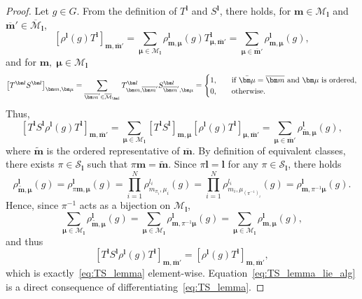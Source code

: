 \documentclass{article}
\newcommand{\rep}[2]{\rho^{#1}_{#2}}
\numberwithin{equation}{section}
\def\bl{{\bm l}}
\def\bbm{{\bm m}}
\def\bmu{{\bm \mu}}
\def\obm{{\overline\bbm}}
\def\calM{\mathcal{M}}
\def\calS{\mathcal{S}}
\def\oMl{\overline{\calM}_\bl}
\def\Nat{{N}}
\begin{document}
\begin{proof}
    Let $g\in G$. From the definition of $T^\bl$ and $S^\bl$, there holds, for $\bbm\in\calM_\bl$ and $\obm'\in\oMl$,
    \[
        \left[\rep{\bl}{}(g)T^\bl\right]_{\bbm,\obm'}=\displaystyle\sum_{\bmu\in\calM_\bl}\rep{\bl}{\bbm,\bmu}(g)T^\bl_{\bmu,\obm'}= \sum_{\bmu\in\obm'}\rep{\bl}{\bbm,\bmu}(g),
    \]
    and for $\bbm,\; \bmu\in\calM_\bl$
    \[
        \left[T^\bl S^\bl\right]_{\bbm,\bmu}= \displaystyle\sum_{\obm'\in\oMl}T^\bl_{\bbm,\obm'} S^\bl_{\obm',\bmu}=\begin{cases}
            1, & \quad\textup{if } \bar\bmu=\obm \textup{ and } \bmu \textup{ is ordered} , \\
            0, & \quad \textup{otherwise}.
        \end{cases} 
    \]
    Thus,
    \begin{equation*}
        \left[T^\bl S^\bl\rep{\bl}{}(g)T^\bl\right]_{\bbm,\obm'} = \displaystyle\sum_{\bmu\in\calM_\bl}\left[T^\bl S^\bl\right]_{\bbm,\bmu}\left[\rep{\bl}{}(g)T^\bl\right]_{\bmu,\obm'} = \sum_{\bmu\in\obm'}\rep{\bl}{\widetilde\bbm,\bmu}(g),
    \end{equation*}
    where $\widetilde\bbm$ is the ordered representative of $\obm$.
    By definition of equivalent classes, there exists ${\pi}\in\calS_\bl$ such that ${\pi}\bbm=\widetilde{\bbm}$. Since ${\pi}\bl=\bl$ for any ${\pi}\in\calS_\bl$, there holds
    \begin{equation*}
        \rep{\bl}{\widetilde\bbm,\bmu}(g) = \rep{\bl}{{\pi}\bbm,\bmu}(g) = \displaystyle\prod_{i=1}^\Nat \rep{l_i}{m_{{\pi}_i},\mu_i}(g) = \displaystyle\prod_{i=1}^\Nat \rep{l_i}{m_i,\mu_{({\pi}^{-1})_i}}(g) = \rep{\bl}{\bbm,{\pi}^{-1}\bmu}(g).
    \end{equation*}
    Hence, since ${\pi}^{-1}$ acts as a bijection on $\calM_\bl$,
    \[
        \sum_{\bmu\in\calM_\bl}\rep{\bl}{\widetilde\bbm,\bmu}(g) = \sum_{\bmu\in\calM_\bl}\rep{\bl}{\bbm,{\pi}^{-1}\bmu}(g) = \sum_{\bmu\in\calM_\bl}\rep{\bl}{\bbm,\bmu}(g),
    \]
    and thus 
    \[
        \left[T^\bl S^\bl\rep{\bl}{}(g)T^\bl\right]_{\bbm,\obm'} = \left[\rep{\bl}{}(g)T^\bl\right]_{\bbm,\obm'},
    \]
    which is exactly~\eqref{eq:TS_lemma} element-wise. Equation~\eqref{eq:TS_lemma_lie_alg} is a direct consequence of differentiating~\eqref{eq:TS_lemma}.
\end{proof}
\end{document}

